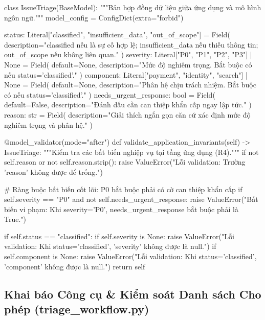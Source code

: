 \documentclass[11pt,a4paper]{article}
\begin{document}
\begin{pythoncode}
class IssueTriage(BaseModel):
    """Bản hợp đồng dữ liệu giữa ứng dụng và mô hình ngôn ngữ."""
    model_config = ConfigDict(extra="forbid")

    status: Literal["classified", "insufficient_data", "out_of_scope"] = Field(
        description="classified nếu là sự cố hợp lệ; insufficient_data nếu thiếu thông tin; out_of_scope nếu không liên quan."
    )
    severity: Literal["P0", "P1", "P2", "P3"] | None = Field(
        default=None, description="Mức độ nghiêm trọng. Bắt buộc có nếu status='classified'."
    )
    component: Literal["payment", "identity", "search"] | None = Field(
        default=None, description="Phân hệ chịu trách nhiệm. Bắt buộc có nếu status='classified'."
    )
    needs_urgent_response: bool = Field(
        default=False, description="Đánh dấu cần can thiệp khẩn cấp ngay lập tức."
    )
    reason: str = Field(
        description="Giải thích ngắn gọn căn cứ xác định mức độ nghiêm trọng và phân hệ."
    )

    @model_validator(mode="after")
    def validate_application_invariants(self) -> IssueTriage:
        """Kiểm tra các bất biến nghiệp vụ tại tầng ứng dụng (R4)."""
        if not self.reason or not self.reason.strip():
            raise ValueError("Lỗi validation: Trường 'reason' không được để trống.")

        # Ràng buộc bất biến cốt lõi: P0 bắt buộc phải có cờ can thiệp khẩn cấp
        if self.severity == "P0" and not self.needs_urgent_response:
            raise ValueError("Bất biến vi phạm: Khi severity='P0', needs_urgent_response bắt buộc phải là True.")

        if self.status == "classified":
            if self.severity is None:
                raise ValueError("Lỗi validation: Khi status='classified', 'severity' không được là null.")
            if self.component is None:
                raise ValueError("Lỗi validation: Khi status='classified', 'component' không được là null.")
        return self
\end{pythoncode}

\subsection{Khai báo Công cụ \& Kiểm soát Danh sách Cho phép (triage\_workflow.py)}
\end{document}
